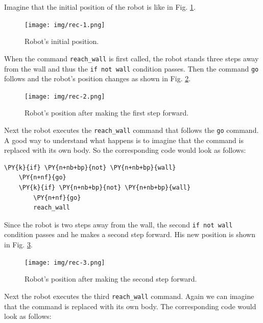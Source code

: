 \noindent
Imagine that the initial position of the robot is like in Fig. \ref{fig:rec1}.


\begin{figure}[!ht]
\begin{center}
\texttt{[image: img/rec-1.png]}
\end{center}
\vspace{-4mm}
\caption{Robot's initial position.}
\label{fig:rec1}
\vspace{-4mm}
\end{figure}
\noindent
When the command {\tt reach\_wall} is first called, the robot stands three steps away from the wall and 
thus the {\tt if not wall} condition passes. Then the command {\tt go} follows and the robot's 
position changes as shown in Fig. \ref{fig:rec2}. 

\begin{figure}[!ht]
\begin{center}
\texttt{[image: img/rec-2.png]}
\end{center}
\vspace{-4mm}
\caption{Robot's position after making the first step forward.}
\label{fig:rec2}
\vspace{-4mm}
\end{figure}
\noindent
Next the robot executes the {\tt reach\_wall} command that follows the {\tt go} command. A good way to 
understand what happens is to imagine that the command is replaced with its own body. So the corresponding 
code would look as follows:\\

\begin{bbox}
\begin{Verbatim}[commandchars=\\\{\}]
\PY{k}{if} \PY{n+nb+bp}{not} \PY{n+nb+bp}{wall}
    \PY{n+nf}{go}
    \PY{k}{if} \PY{n+nb+bp}{not} \PY{n+nb+bp}{wall}
        \PY{n+nf}{go}
        reach_wall
\end{Verbatim}
\end{bbox}
\vspace{6mm}

\noindent
Since the robot is two steps away from the wall, the second {\tt if not wall} condition passes and 
he makes a second step forward. His new position is shown in Fig. \ref{fig:rec3}.

\begin{figure}[!ht]
\begin{center}
\texttt{[image: img/rec-3.png]}
\end{center}
\vspace{-4mm}
\caption{Robot's position after making the second step forward.}
\label{fig:rec3}
\vspace{-4mm}
\end{figure}
\noindent
Next the robot executes the third {\tt reach\_wall} command. Again we can imagine that the command 
is replaced with its own body. The corresponding code would look as follows:\\

